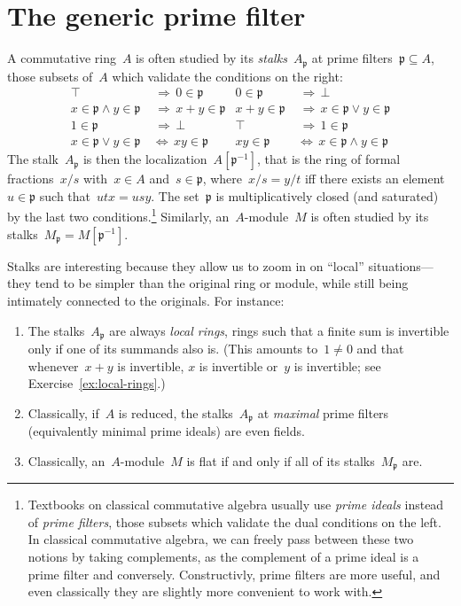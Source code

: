 \documentclass[10pt,reqno,a4paper,openany]{amsbook}
\theoremstyle{definition}
\theoremstyle{plain}
\theoremstyle{remark}
\newcommand{\ppp}{\mathfrak{p}}
\newcommand{\?}{\,{:}\,}
\renewcommand{\_}{\mathpunct{.}\,}
\begin{document}
\section{The generic prime filter}

A commutative ring~$A$ is often studied by its \emph{stalks}~$A_\ppp$ at prime
filters~$\ppp \subseteq A$, those subsets of~$A$ which validate the conditions
on the right:
\begin{align*}
  \top &\,\,\Longrightarrow\, 0 \in \ppp &
  0 \in \ppp &\,\,\Longrightarrow\, \bot \\
  x \in \ppp \wedge y \in \ppp &\,\,\Longrightarrow\, x + y \in \ppp &
  x + y \in \ppp &\,\,\Longrightarrow\, x \in \ppp \vee y \in \ppp \\
  1 \in \ppp &\,\,\Longrightarrow\, \bot &
  \top &\,\,\Longrightarrow\, 1 \in\ppp \\
  x \in \ppp \vee y \in \ppp &\,\Longleftrightarrow\, xy \in \ppp &
  xy \in \ppp &\,\Longleftrightarrow\, x \in \ppp \wedge y \in \ppp
\end{align*}
The stalk~$A_\ppp$ is then the localization~$A[\ppp^{-1}]$, that is
the ring of formal fractions~$x/s$ with~$x \in A$ and~$s \in \ppp$, where~$x/s
= y/t$ iff there exists an element~$u \in \ppp$ such that~$utx = usy$.
The set~$\ppp$ is multiplicatively closed (and saturated) by the last two
conditions.\footnote{Textbooks on classical commutative algebra usually use
\emph{prime ideals} instead of \emph{prime filters}, those subsets which
validate the dual conditions on the left. In classical commutative algebra, we
can freely pass between these two notions by taking complements, as the
complement of a prime ideal is a prime filter and conversely. Constructivly,
prime filters are more useful, and even classically they are slightly more
convenient to work with.} Similarly, an~$A$-module~$M$ is often studied by its
stalks~$M_\ppp = M[\ppp^{-1}]$.

Stalks are interesting because they allow us to zoom in on ``local''
situations---they tend to be simpler than the original ring or module, while
still being intimately connected to the originals. For instance:
\begin{enumerate}
\item The stalks~$A_\ppp$ are always \emph{local
rings},\label{page:local-rings} rings such that a finite sum is invertible only
if one of its summands also is. (This amounts to~$1 \neq 0$ and that
whenever~$x+y$ is invertible, $x$ is invertible or~$y$ is invertible; see
Exercise~\ref{ex:local-rings}.)
\item Classically, if~$A$ is reduced, the stalks~$A_\ppp$ at
\emph{maximal} prime filters (equivalently minimal prime ideals) are even fields.
\item Classically, an~$A$-module~$M$ is flat if and only if all of its stalks~$M_\ppp$ are.
\end{enumerate}
\end{document}
